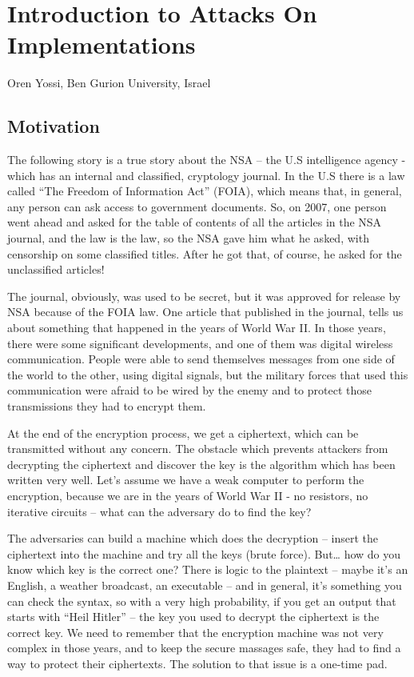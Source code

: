 \chapter{Introduction to Attacks On Implementations}
\label{chap:c1_IntroductionAOI}

Oren Yossi, Ben Gurion University, Israel

\section{Motivation} %
\label{sec:Motivation}

The following story is a true story about the NSA – the U.S intelligence agency -  which has an internal and classified, cryptology journal. In the U.S there is a law called “The Freedom of Information Act” (FOIA), which means that, in general, any person can ask access to government documents. So, on 2007, one person went ahead and asked for the table of contents of all the articles in the NSA journal, and the law is the law, so the NSA gave him what he asked, with censorship on some classified titles. After he got that, of course, he asked for the unclassified articles!

The journal, obviously, was used to be secret, but it was approved for release by NSA because of the FOIA law. One article that published in the journal, tells us about something that happened in the years of World War II. In those years, there were some significant developments, and one of them was digital wireless communication. People were able to send themselves messages from one side of the world to the other, using digital signals, but the military forces that used this communication were afraid to be wired by the enemy and to protect those transmissions they had to encrypt them.    

At the end of the encryption process, we get a ciphertext, which can be transmitted without any concern. The obstacle which prevents attackers from decrypting the ciphertext and discover the key is the algorithm which has been written very well.  
Let’s assume we have a weak computer to perform the encryption, because we are in the years of World War II -  no resistors, no iterative circuits – what can the adversary do to find the key?

The adversaries can build a machine which does the decryption – insert the ciphertext into the machine and try all the keys (brute force). But… how do you know which key is the correct one? There is logic to the plaintext – maybe it’s an English, a weather broadcast, an executable – and in general, it’s something you can check the syntax, so with a very high probability, if you get an output that starts with “Heil Hitler” – the key you used to decrypt the ciphertext is the correct key. We need to remember that the encryption machine was not very complex in those years, and to keep the secure massages safe, they had to find a way to protect their ciphertexts. The solution to that issue is a one-time pad.

